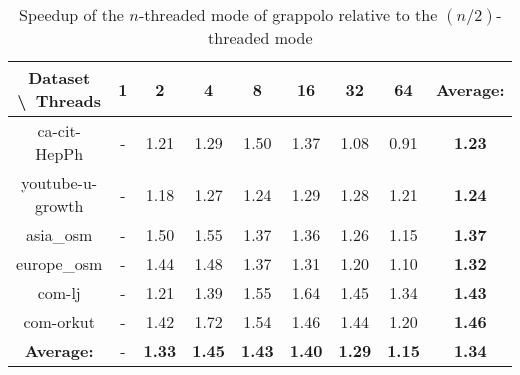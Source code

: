 \begin{table}[H]
	\centering
	\begin{tabular}{|c|c|c|c|c|c|c|c|c|}
		\hline
		Dataset \textbackslash\ Threads& 1 & 2 & 4 & 8 & 16 & 32 & 64 & \textbf{Average:} \\
		\hline
		ca-cit-HepPh & - & 1.21 & 1.29 & 1.50 & 1.37 & 1.08 & 0.91 & \textbf{1.23} \\
		\hline
		youtube-u-growth & - & 1.18 & 1.27 & 1.24 & 1.29 & 1.28 & 1.21 & \textbf{1.24} \\
		\hline
		asia\_osm & - & 1.50 & 1.55 & 1.37 & 1.36 & 1.26 & 1.15 & \textbf{1.37} \\
		\hline
		europe\_osm & - & 1.44 & 1.48 & 1.37 & 1.31 & 1.20 & 1.10 & \textbf{1.32} \\
		\hline
		com-lj & - & 1.21 & 1.39 & 1.55 & 1.64 & 1.45 & 1.34 & \textbf{1.43} \\
		\hline
		com-orkut & - & 1.42 & 1.72 & 1.54 & 1.46 & 1.44 & 1.20 & \textbf{1.46} \\
		\hline
		\textbf{Average:} & - & \textbf{1.33} & \textbf{1.45} & \textbf{1.43} & \textbf{1.40} & \textbf{1.29} & \textbf{1.15} & \textbf{1.34} \\
		\hline
	\end{tabular}
\caption{Speedup of the $n$-threaded mode of grappolo relative to the $(n/2)$-threaded mode}
\label{T:relative speedup for grappolo}
\end{table}